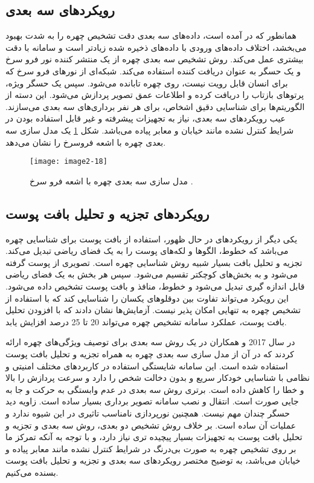 \subsection{رویکرد‌های سه بعدی}
همانطور که در \cite{10.3745/JIPS.2009.5.2.041} آمده است، داده‌های سه بعدی دقت تشخیص چهره را به شدت بهبود می‌بخشد، اختلاف داده‌های ورودی با داده‌های ذخیره شده زیادتر است و سامانه با دقت بیشتری عمل می‌کند. روش تشخیص سه بعدی چهره از یک منتشر کننده نور فرو سرخ و یک حسگر به عنوان دریافت کننده استفاده می‌کند. شبکه‌ای از نورهای فرو سرخ که برای انسان قابل رویت نیست، روی چهره تابانده می‌شود. سپس یک حسگر ویژه، پرتوهای بازتاب را دریافت کرده و اطلاعات عمق تصویر پردازش می‌شود. این دسته از الگوریتم‌ها برای شناسایی دقیق اشخاص، برای هر نفر برداری‌های سه بعدی می‌سازند. عیب رویکردهای سه بعدی، نیاز به تجهیزات پیشرفته و غیر قابل استفاده بودن در شرایط کنترل نشده مانند خیابان و معابر پیاده می‌باشد. شکل \ref{image2-18} یک مدل سازی سه بعدی چهره با اشعه فروسرخ را نشان می‌دهد.

\begin{figure}[h]
\centering
  \texttt{[image: image2-18]}
  \caption{مدل سازی سه بعدی چهره با اشعه فرو سرخ \cite{10.3745/JIPS.2009.5.2.041}.}
  \label{image2-18}
\end{figure}
 
 \subsection{رویکرد‌های تجزیه و تحلیل بافت پوست}
یکی دیگر از رویکردهای در حال ظهور، استفاده از بافت پوست برای شناسایی چهره می‌باشد که خطوط، الگوها و لکه‌های پوست را به یک فضای ریاضی تبدیل می‌کند. تجزیه و تحلیل بافت بسیار شبیه روش شناسایی چهره است. تصویری از پوست گرفته می‌شود و به بخش‌های کوچکتر تقسیم می‌شود. سپس هر بخش به یک فضای ریاضی قابل اندازه گیری تبدیل می‌شود و خطوط، منافذ و بافت پوست تشخیص داده می‌شود. این رویکرد می‌تواند تفاوت بین دوقلوهای یکسان را شناسایی کند که با استفاده از تشخیص چهره به تنهایی امکان پذیر نیست. آزمایش‌ها نشان دادند که با افزودن تحلیل بافت پوست، عملکرد سامانه تشخیص چهره می‌تواند 20 تا 25 درصد افزایش یابد.

\noindent
در سال 2017  و همکاران در \cite{HU2017366} یک روش سه بعدی برای توصیف ویژگی‌های چهره ارائه کردند که در آن از مدل سازی سه بعدی چهره به همراه تجزیه و تحلیل بافت پوست استفاده شده است. این سامانه شایستگی استفاده در کاربردهای مختلف امنیتی و نظامی با شناسایی خودکار سریع و بدون دخالت شخص را دارد و سرعت پردازش را بالا و خطا را کاهش داده است. برتری روش سه بعدی در عدم وابستگی به حرکت و جا به جایی صورت است. انتقال و نصب سامانه تصویر برداری بسیار ساده است. زاویه دید حسگر چندان مهم نیست. همچنین نورپردازی نامناسب تاثیری در این شیوه ندارد و عملیات آن ساده است. بر خلاف روش تشخیص دو بعدی، روش سه بعدی و تجزیه و تحلیل بافت پوست به تجهیزات بسیار پیچیده تری نیاز دارد، و با توجه به آنکه تمرکز ما بر روی تشخیص چهره به صورت بی‌درنگ در شرایط کنترل نشده مانند معابر پیاده و خیابان می‌باشد، به توضیح مختصر رویکردهای سه بعدی و تجزیه و تحلیل بافت پوست بسنده می‌کنیم.

